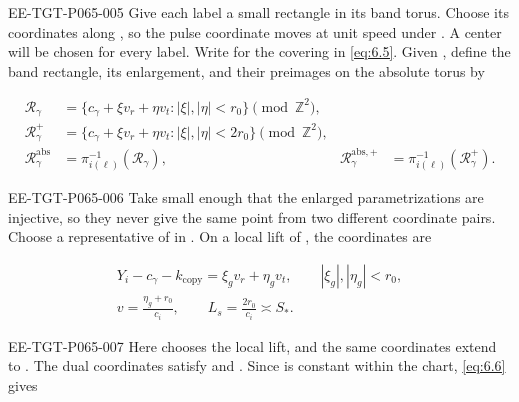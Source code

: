 \begin{EESegment}{EE-TGT-P065-005}
Give each label a small rectangle in its band torus. Choose its coordinates along , so the pulse coordinate moves at unit speed under . A center  will be chosen for every label. Write  for the covering in \eqref{eq:6.5}. Given , define the band rectangle, its enlargement, and their preimages on the absolute torus by
\end{EESegment}
\begin{equation}
\begin{aligned}
 \mathcal R_\gamma
 &=\{c_\gamma+\xi v_r+\eta v_t:|\xi|,|\eta|<r_0\}\pmod{\mathbb Z^2},\\
 \mathcal R_\gamma^+
 &=\{c_\gamma+\xi v_r+\eta v_t:|\xi|,|\eta|<2r_0\}\pmod{\mathbb Z^2},\\
 \mathcal R_\gamma^{\mathrm{abs}}
 &=\pi_{i(\ell)}^{-1}(\mathcal R_\gamma),
 &\mathcal R_\gamma^{\mathrm{abs},+}
 &=\pi_{i(\ell)}^{-1}(\mathcal R_\gamma^+).
\end{aligned}
\tag{6.10}\label{eq:6.10}
\end{equation}
\begin{EESegment}{EE-TGT-P065-006}
Take  small enough that the enlarged parametrizations are injective, so they never give the same point from two different coordinate pairs. Choose a representative of  in . On a local lift of , the coordinates are
\end{EESegment}
\begin{equation}
\begin{gathered}
 Y_i-c_\gamma-k_{\mathrm{copy}}=\xi_gv_r+\eta_gv_t,
 \qquad |\xi_g|,|\eta_g|<r_0,\\
 v=\frac{\eta_g+r_0}{c_i},
 \qquad
 L_s=\frac{2r_0}{c_i}\asymp S_*.
\end{gathered}
\tag{6.11}\label{eq:6.11}
\end{equation}
\begin{EESegment}{EE-TGT-P065-007}
Here  chooses the local lift, and the same coordinates extend to . The dual coordinates satisfy  and . Since  is constant within the chart, \eqref{eq:6.6} gives
\end{EESegment}
